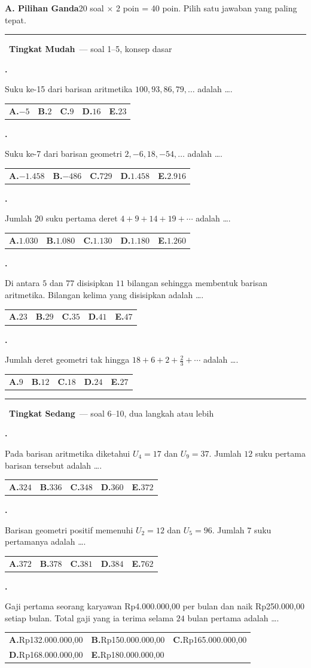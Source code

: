 \documentclass[a4paper,11pt]{article}
\newcommand{\dis}{\displaystyle}
\newcounter{no}
\newcommand{\bagian}[2]{\par\Needspace{6\baselineskip}\vspace{1.0em}\noindent
  \begin{tcolorbox}[colback=navy,colframe=navy,coltext=white,boxrule=0pt,arc=2pt,left=6pt,right=6pt,top=3pt,bottom=3pt]
  \textbf{#1}\hfill{\small #2}\end{tcolorbox}\setcounter{no}{0}\par\vspace{-0.3em}}
\newcommand{\tingkat}[2]{\par\Needspace{7\baselineskip}\vspace{0.6em}\noindent
  {\color{teal}\rule{3pt}{1.1em}}\ {\color{navy}\bfseries #1}\ {\small\color{gray}--- #2}\par\vspace{0.1em}}
\newcommand{\soal}[2]{\par\vspace{0.75em}\stepcounter{no}\noindent
  \begin{minipage}[t]{1.8em}\textbf{\theno.}\end{minipage}%
  \begin{minipage}[t]{\dimexpr\linewidth-1.8em\relax}#1\par\vspace{0.35em}#2\end{minipage}\par}
\begin{document}
\bagian{A. Pilihan Ganda}{20 soal $\times$ 2 poin = 40 poin. Pilih satu jawaban yang paling tepat.}
\tingkat{Tingkat Mudah}{soal 1--5, konsep dasar}
\soal{Suku ke-15 dari barisan aritmetika $100,93,86,79,\ldots$ adalah \dots.}{\begin{tabularx}{\linewidth}{@{}*{5}{X}@{}}\textbf{A.}\;$-5$ & \textbf{B.}\;$2$ & \textbf{C.}\;$9$ & \textbf{D.}\;$16$ & \textbf{E.}\;$23$\end{tabularx}}
\soal{Suku ke-7 dari barisan geometri $2,-6,18,-54,\ldots$ adalah \dots.}{\begin{tabularx}{\linewidth}{@{}*{5}{X}@{}}\textbf{A.}\;$-1.458$ & \textbf{B.}\;$-486$ & \textbf{C.}\;$729$ & \textbf{D.}\;$1.458$ & \textbf{E.}\;$2.916$\end{tabularx}}
\soal{Jumlah $20$ suku pertama deret $4+9+14+19+\cdots$ adalah \dots.}{\begin{tabularx}{\linewidth}{@{}*{5}{X}@{}}\textbf{A.}\;$1.030$ & \textbf{B.}\;$1.080$ & \textbf{C.}\;$1.130$ & \textbf{D.}\;$1.180$ & \textbf{E.}\;$1.260$\end{tabularx}}
\soal{Di antara $5$ dan $77$ disisipkan $11$ bilangan sehingga membentuk barisan aritmetika. Bilangan kelima yang disisipkan adalah \dots.}{\begin{tabularx}{\linewidth}{@{}*{5}{X}@{}}\textbf{A.}\;$23$ & \textbf{B.}\;$29$ & \textbf{C.}\;$35$ & \textbf{D.}\;$41$ & \textbf{E.}\;$47$\end{tabularx}}
\soal{Jumlah deret geometri tak hingga $18+6+2+\dis\frac23+\cdots$ adalah \dots.}{\begin{tabularx}{\linewidth}{@{}*{5}{X}@{}}\textbf{A.}\;$9$ & \textbf{B.}\;$12$ & \textbf{C.}\;$18$ & \textbf{D.}\;$24$ & \textbf{E.}\;$27$\end{tabularx}}
\tingkat{Tingkat Sedang}{soal 6--10, dua langkah atau lebih}
\soal{Pada barisan aritmetika diketahui $U_4=17$ dan $U_9=37$. Jumlah $12$ suku pertama barisan tersebut adalah \dots.}{\begin{tabularx}{\linewidth}{@{}*{5}{X}@{}}\textbf{A.}\;$324$ & \textbf{B.}\;$336$ & \textbf{C.}\;$348$ & \textbf{D.}\;$360$ & \textbf{E.}\;$372$\end{tabularx}}
\soal{Barisan geometri positif memenuhi $U_2=12$ dan $U_5=96$. Jumlah $7$ suku pertamanya adalah \dots.}{\begin{tabularx}{\linewidth}{@{}*{5}{X}@{}}\textbf{A.}\;$372$ & \textbf{B.}\;$378$ & \textbf{C.}\;$381$ & \textbf{D.}\;$384$ & \textbf{E.}\;$762$\end{tabularx}}
\soal{Gaji pertama seorang karyawan Rp4.000.000,00 per bulan dan naik Rp250.000,00 setiap bulan. Total gaji yang ia terima selama $24$ bulan pertama adalah \dots.}{\begin{tabularx}{\linewidth}{@{}*{3}{X}@{}}\textbf{A.}\;Rp132.000.000,00 & \textbf{B.}\;Rp150.000.000,00 & \textbf{C.}\;Rp165.000.000,00\\[3pt] \textbf{D.}\;Rp168.000.000,00 & \textbf{E.}\;Rp180.000.000,00 & \end{tabularx}}
\end{document}
